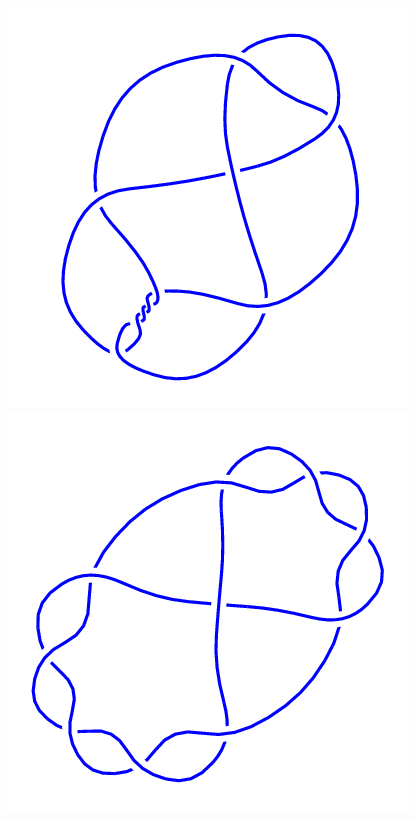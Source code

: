 \begin{figure}[H]
	\begin{minipage}[b]{.18\linewidth}
		\centering
		\includegraphics[width=\linewidth]{../data/10_7.png}
	\end{minipage}
	\begin{minipage}[b]{.18\linewidth}
		\centering
		\includegraphics[width=\linewidth]{../data/10_8.png}

\end{minipage}
\end{figure}
